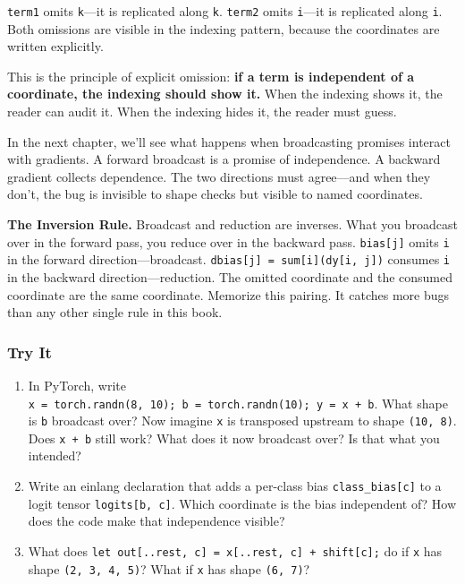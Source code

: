 \documentclass[11pt,]{article}
\begin{document}
\texttt{term1} omits \texttt{k}---it is replicated along \texttt{k}.
\texttt{term2} omits \texttt{i}---it is replicated along \texttt{i}.
Both omissions are visible in the indexing pattern, because the
coordinates are written explicitly.

This is the principle of explicit omission: \textbf{if a term is
independent of a coordinate, the indexing should show it.} When the
indexing shows it, the reader can audit it. When the indexing hides it,
the reader must guess.

In the next chapter, we'll see what happens when broadcasting promises
interact with gradients. A forward broadcast is a promise of
independence. A backward gradient collects dependence. The two
directions must agree---and when they don't, the bug is invisible to
shape checks but visible to named coordinates.

\textbf{The Inversion Rule.} Broadcast and reduction are inverses. What
you broadcast over in the forward pass, you reduce over in the backward
pass. \texttt{bias{[}j{]}} omits \texttt{i} in the forward
direction---broadcast.
\texttt{dbias{[}j{]}\ =\ sum{[}i{]}(dy{[}i,\ j{]})} consumes \texttt{i}
in the backward direction---reduction. The omitted coordinate and the
consumed coordinate are the same coordinate. Memorize this pairing. It
catches more bugs than any other single rule in this book.

\hypertarget{try-it-3}{%
\subsubsection{Try It}\label{try-it-3}}

\begin{enumerate}
\def\labelenumi{\arabic{enumi}.}
\item
  In PyTorch, write
  \texttt{x\ =\ torch.randn(8,\ 10);\ b\ =\ torch.randn(10);\ y\ =\ x\ +\ b}.
  What shape is \texttt{b} broadcast over? Now imagine \texttt{x} is
  transposed upstream to shape \texttt{(10,\ 8)}. Does \texttt{x\ +\ b}
  still work? What does it now broadcast over? Is that what you
  intended?
\item
  Write an einlang declaration that adds a per-class bias
  \texttt{class\_bias{[}c{]}} to a logit tensor
  \texttt{logits{[}b,\ c{]}}. Which coordinate is the bias independent
  of? How does the code make that independence visible?
\item
  What does
  \texttt{let\ out{[}..rest,\ c{]}\ =\ x{[}..rest,\ c{]}\ +\ shift{[}c{]};}
  do if \texttt{x} has shape \texttt{(2,\ 3,\ 4,\ 5)}? What if
  \texttt{x} has shape \texttt{(6,\ 7)}?
\end{enumerate}
\end{document}
